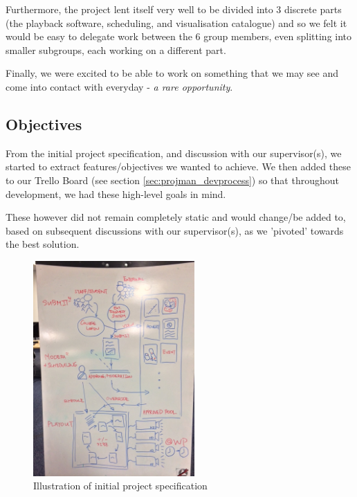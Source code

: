 \documentclass[a4paper, titlepage]{article}
\begin{document}
Furthermore, the project lent itself very well to be divided into 3 discrete parts (the playback software, scheduling, and visualisation catalogue) and so we felt it would be easy to delegate work between the 6 group members, even splitting into smaller subgroups, each working on a different part.

Finally, we were excited to be able to work on something that we may see and come into contact with everyday - \textit{a rare opportunity}.

\subsection{Objectives} \label{sec:intro_objectives}

From the initial project specification, and discussion with our supervisor(s), we started to extract features/objectives we wanted to achieve. We then added these to our Trello Board (see section \ref{sec:projman_devprocess}) so that throughout development, we had these high-level goals in mind. 

These however did not remain completely static and would change/be added to, based on subsequent discussions with our supervisor(s), as we 'pivoted' towards the best solution.

\begin{figure}[h]
  \centering
    \includegraphics[width = 0.55\textwidth, trim = 0 0.5cm 0 1.2cm, clip]{./intro/userreq.jpg}
  \caption{Illustration of initial project specification}
  \label{fig:intro_userreq}
\end{figure}
\end{document}
